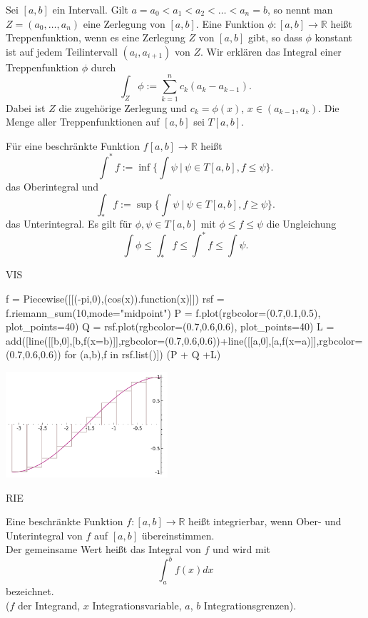 \documentclass[fontsize=12pt,paper=a4,twoside,bibtotoc,idxtotoc,
liststotoc,pagesize,BCOR1.2cm,DIV15,chapterprefix,pagesize=pdftex]{scrbook}
\theoremstyle{plain}
\theoremstyle{definition}
\theoremstyle{remark}
\begin{document}
  Sei $[a,b]$ ein Intervall. Gilt $a=a_0 < a_1 <a_2 < \dots <
                                 a_n=b$, so nennt man $Z=(a_0, \dots
                                 ,a_n)$ eine {\color{red} Zerlegung} von
                                 $[a,b]$.
 Eine Funktion $\phi:[a,b] \rightarrow \mathbb{R}$ heißt {\color{red}
                                 Treppenfunktion}, wenn es eine
                                 Zerlegung $Z$ von $[a,b]$ gibt, so dass
                                 $\phi$ konstant ist auf jedem
                                 Teilintervall $(a_i,a_{i+1})$ von $Z$.
 Wir erklären das Integral einer Treppenfunktion $\phi$ durch
\[\int_Z \phi := \sum_{k=1}^n c_k (a_k -a_{k-1}).\]
Dabei ist $Z$ die zugehörige Zerlegung und $c_k=\phi(x)$, $x\in
(a_{k-1},a_k)$.  
 Die Menge aller Treppenfunktionen auf $[a,b]$ sei $T[a,b]$.


Für eine beschränkte Funktion $f[a,b]\rightarrow \mathbb{R}$
heißt
\[ \int^*f:= \inf  \{ \int \psi \ | \ \psi \in T[a,b], f \leq \psi \}. \]
das {\color{red} Oberintegral} und 
\[ \int_*f:= \sup  \{ \int \psi \ | \ \psi \in T[a,b], f \geq \psi \}.\]
das {\color{red} Unterintegral}. Es gilt für $\phi, \psi \in T[a,b]$ mit
$\phi \leq f \leq \psi$ die Ungleichung
\[ \int \phi \leq \int_* f \leq \int^* f \leq \int \psi.\]

VIS

\begin{sagein}
f = Piecewise([[(-pi,0),(cos(x)).function(x)]])
rsf = f.riemann_sum(10,mode="midpoint")
P = f.plot(rgbcolor=(0.7,0.1,0.5), plot_points=40)
Q = rsf.plot(rgbcolor=(0.7,0.6,0.6), plot_points=40)
L = add([line([[b,0],[b,f(x=b)]],rgbcolor=(0.7,0.6,0.6))+line([[a,0],[a,f(x=a)]],rgbcolor=(0.7,0.6,0.6)) for (a,b),f in rsf.list()])
(P + Q +L)
\end{sagein}
\begin{center}
\includegraphics[width=6cm]{riemann.pdf}
\end{center}

RIE

Eine beschränkte Funktion $f:[a,b] \rightarrow \mathbb{R}$ heißt {\color{red}
integrierbar}, wenn Ober- und Unterintegral von $f$ auf $[a,b]$ übereinstimmen.\\
Der gemeinsame Wert heißt das {\color{red} Integral} von $f$ und wird mit 
\[ \int_a^b f(x)dx \]
bezeichnet.\\ 
($f$ der Integrand, $x$ Integrationsvariable, $a$, $b$ Integrationsgrenzen).
\end{document}
